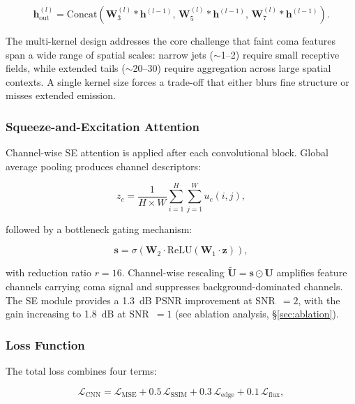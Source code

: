 \documentclass[preprint2]{aastex631}
\begin{document}
\begin{equation}\label{eq:multi_kernel}
\mathbf{h}_{\text{out}}^{(l)} = \text{Concat}\left(\mathbf{W}_3^{(l)} * \mathbf{h}^{(l-1)},\, \mathbf{W}_5^{(l)} * \mathbf{h}^{(l-1)},\, \mathbf{W}_7^{(l)} * \mathbf{h}^{(l-1)}\right).
\end{equation}

The multi-kernel design addresses the core challenge that faint coma features span a wide range of spatial scales: narrow jets ($\sim$1--2\arcsec) require small receptive fields, while extended tails ($\sim$20--30\arcsec) require aggregation across large spatial contexts. A single kernel size forces a trade-off that either blurs fine structure or misses extended emission.

\subsubsection{Squeeze-and-Excitation Attention}

Channel-wise SE attention \citep{hu18} is applied after each convolutional block. Global average pooling produces channel descriptors:

\begin{equation}\label{eq:se_squeeze}
z_c = \frac{1}{H \times W} \sum_{i=1}^{H} \sum_{j=1}^{W} u_c(i, j),
\end{equation}

followed by a bottleneck gating mechanism:

\begin{equation}\label{eq:se_excitation}
\mathbf{s} = \sigma\left(\mathbf{W}_2 \cdot \text{ReLU}\left(\mathbf{W}_1 \cdot \mathbf{z}\right)\right),
\end{equation}

with reduction ratio $r=16$. Channel-wise rescaling $\tilde{\mathbf{U}} = \mathbf{s} \odot \mathbf{U}$ amplifies feature channels carrying coma signal and suppresses background-dominated channels. The SE module provides a 1.3~dB PSNR improvement at SNR~$=2$, with the gain increasing to 1.8~dB at SNR~$=1$ (see ablation analysis, \S\ref{sec:ablation}).

\subsubsection{Loss Function}

The total loss combines four terms:

\begin{equation}\label{eq:total_loss}
\mathcal{L}_{\text{CNN}} = \mathcal{L}_{\text{MSE}} + 0.5\,\mathcal{L}_{\text{SSIM}} + 0.3\,\mathcal{L}_{\text{edge}} + 0.1\,\mathcal{L}_{\text{flux}},
\end{equation}
\end{document}
